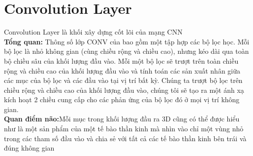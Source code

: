 \documentclass[a4paper,12pt]{report}
\begin{document}
\section{Convolution Layer}
Convolution Layer là khối xây dựng cốt lõi của mạng CNN \\ 

\textbf{Tổng quan:} Thông số lớp CONV của bao gồm một tập hợp các bộ lọc học. Mỗi bộ lọc là nhỏ không gian (cùng chiều rộng và chiều cao), nhưng kéo dài qua toàn bộ chiều sâu của khối lượng đầu vào. Mỗi một bộ lọc sẽ trượt trên toàn chiều rộng và chiều cao của khối lượng đầu vào và tính toán các sản xuất nhân giữa các mục của bộ lọc và các đầu vào tại vị trí bất kỳ. Chúng ta trượt bộ lọc trên chiều rộng và chiều cao của khối lượng đầu vào, chúng tôi sẽ tạo ra một ánh xạ kích hoạt 2 chiều cung cấp cho các phản ứng của bộ lọc đó ở mọi vị trí không gian. \\ 

\textbf{Quan điểm não:}Mỗi mục trong khối lượng đầu ra 3D cũng có thể được hiểu như là một sản phẩm của một tế bào thần kinh mà nhìn vào chỉ một vùng nhỏ trong các tham số đầu vào và chia sẻ với tất cả các tế bào thần kinh bên trái và đúng không gian \\ 
 
\end{document}
